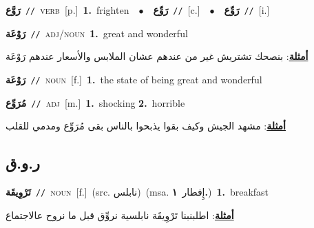 \documentclass[10pt,a4paper,twoside]{article} %
\begin{document}
\begin{multicols}{2}
{\setlength\topsep{0pt}\textbf{\foreignlanguage{arabic}{رَوَّع}}\ {\color{gray}\texttt{//}\color{black}}\ \textsc{verb}\ [p.]\ \textbf{1.}~frighten\ \ $\bullet$\ \ \setlength\topsep{0pt}\textbf{\foreignlanguage{arabic}{رَوِّع}}\ {\color{gray}\texttt{//}\color{black}}\ [c.]\ \ $\bullet$\ \ \setlength\topsep{0pt}\textbf{\foreignlanguage{arabic}{رَوِّع}}\ {\color{gray}\texttt{//}\color{black}}\ [i.]\ } \vspace{2mm}

{\setlength\topsep{0pt}\textbf{\foreignlanguage{arabic}{رَوْعَة}}\ {\color{gray}\texttt{//}\color{black}}\ \textsc{adj/noun}\ \textbf{1.}~great and wonderful\  \begin{flushright}\color{gray}\foreignlanguage{arabic}{\textbf{\underline{\foreignlanguage{arabic}{أمثلة}}}: بنصحك تشتريش غير من عندهم عشان الملابس والأسعار عندهم رَوْعَة}\end{flushright}\color{black}} \vspace{2mm}

{\setlength\topsep{0pt}\textbf{\foreignlanguage{arabic}{رَوْعَة}}\ {\color{gray}\texttt{//}\color{black}}\ \textsc{noun}\ [f.]\ \textbf{1.}~the state of being great and wonderful\ } \vspace{2mm}

{\setlength\topsep{0pt}\textbf{\foreignlanguage{arabic}{مُرَوِّع}}\ {\color{gray}\texttt{//}\color{black}}\ \textsc{adj}\ [m.]\ \textbf{1.}~shocking  \textbf{2.}~horrible\  \begin{flushright}\color{gray}\foreignlanguage{arabic}{\textbf{\underline{\foreignlanguage{arabic}{أمثلة}}}: مشهد الجيش وكيف بقوا يذبحوا بالناس بقى مُرَوِّع ومدمي للقلب}\end{flushright}\color{black}} \vspace{2mm}

\vspace{-3mm}
\subsection*{\color{blue}\foreignlanguage{arabic}{ر.و.ق}\color{blue}{}} 

{\setlength\topsep{0pt}\textbf{\foreignlanguage{arabic}{تَرْوِيقَة}}\ {\color{gray}\texttt{//}\color{black}}\ \textsc{noun}\ [f.]\ (src. \color{gray}\foreignlanguage{arabic}{نابلس}\color{black})\ \color{gray}(msa. \foreignlanguage{arabic}{إِفطار}~\foreignlanguage{arabic}{\textbf{١.}})\color{black}\ \textbf{1.}~breakfast\  \begin{flushright}\color{gray}\foreignlanguage{arabic}{\textbf{\underline{\foreignlanguage{arabic}{أمثلة}}}: اطلبنبنا تَرْوِيقَة نابلسية نروِّق قبل ما نروح عالاجتماع}\end{flushright}\color{black}} \vspace{2mm}


\end{multicols}
\end{document}
